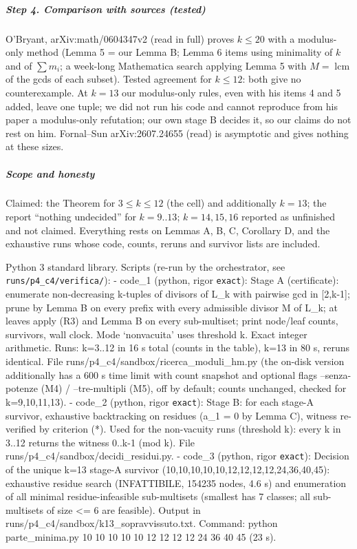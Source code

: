 \subparagraph{Step 4. Comparison with sources
(tested)}\label{step-4.-comparison-with-sources-tested}

O'Bryant, arXiv:math/0604347v2 (read in full) proves \(k\le20\) with a
modulus-only method (Lemma 5 = our Lemma B; Lemma 6 items using
minimality of \(k\) and of \(\sum m_i\); a week-long Mathematica search
applying Lemma 5 with \(M=\operatorname{lcm}\) of the gcds of each
subset). Tested agreement for \(k\le12\): both give no counterexample.
At \(k=13\) our modulus-only rules, even with his items 4 and 5 added,
leave one tuple; we did not run his code and cannot reproduce from his
paper a modulus-only refutation; our own stage B decides it, so our
claims do not rest on him. Fornal--Sun arXiv:2607.24655 (read) is
asymptotic and gives nothing at these sizes.

\subparagraph{Scope and honesty}\label{scope-and-honesty}

Claimed: the Theorem for \(3\le k\le12\) (the cell) and additionally
\(k=13\); the report ``nothing undecided'' for \(k=9..13\);
\(k=14,15,16\) reported as unfinished and not claimed. Everything rests
on Lemmas A, B, C, Corollary D, and the exhaustive runs whose code,
counts, reruns and survivor lists are included.


Python 3 standard library. Scripts (re-run by the orchestrator, see
\texttt{runs/p4\_c4/verifica/}): - code\_1 (python, rigor
\texttt{exact}): Stage A (certificate): enumerate non-decreasing
k-tuples of divisors of L\_k with pairwise gcd in {[}2,k-1{]}; prune by
Lemma B on every prefix with every admissible divisor M of L\_k; at
leaves apply (R3) and Lemma B on every sub-multiset; print node/leaf
counts, survivors, wall clock. Mode `nonvacuita' uses threshold k. Exact
integer arithmetic. Runs: k=3..12 in 16 s total (counts in the table),
k=13 in 80 s, reruns identical. File
runs/p4\_c4/sandbox/ricerca\_moduli\_hm.py (the on-disk version
additionally has a 600 s time limit with count snapshot and optional
flags --senza-potenze (M4) / --tre-multipli (M5), off by default; counts
unchanged, checked for k=9,10,11,13). - code\_2 (python, rigor
\texttt{exact}): Stage B: for each stage-A survivor, exhaustive
backtracking on residues (a\_1 = 0 by Lemma C), witness re-verified by
criterion (*). Used for the non-vacuity runs (threshold k): every k in
3..12 returns the witness 0..k-1 (mod k). File
runs/p4\_c4/sandbox/decidi\_residui.py. - code\_3 (python, rigor
\texttt{exact}): Decision of the unique k=13 stage-A survivor
(10,10,10,10,10,12,12,12,12,24,36,40,45): exhaustive residue search
(INFATTIBILE, 154235 nodes, 4.6 s) and enumeration of all minimal
residue-infeasible sub-multisets (smallest has 7 classes; all
sub-multisets of size \textless= 6 are feasible). Output in
runs/p4\_c4/sandbox/k13\_sopravvissuto.txt. Command: python
parte\_minima.py 10 10 10 10 10 12 12 12 12 24 36 40 45 (23 s).


